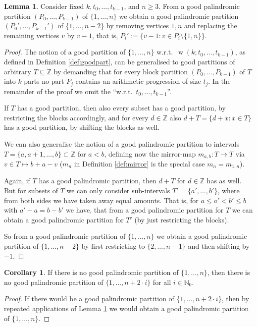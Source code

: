 \documentclass[final,3p,times]{elsarticle}
\theoremstyle{definition}
\newtheorem{lem}{Lemma}[section]
\newtheorem{cor}{Corollary}[lem]
\newcommand{\set}[1]{\{#1\}}
\renewcommand{\leq}{\le} %
\newcommand{\NN}{\mathbb{N}}
\newcommand{\NNZ}{\NN_0}
\newcommand{\ZZ}{\mathbb{Z}}
\DeclareMathOperator{\vdw}{w}
\begin{document}
\begin{lem}\label{lem:transferpdpartitions}
  Consider fixed $k, t_0, \dots, t_{k-1}$, and $n \geq 3$. From a good palindromic partition $(P_0, \dots, P_{k-1})$ of $\set{1,\dots,n}$ we obtain a good palindromic partition $(P_0', \dots, P_{k-1}')$ of $\set{1,\dots,n-2}$ by removing vertices $1, n$ and replacing the remaining vertices $v$ by $v-1$, that is, $P_i' := \set{v - 1 : v \in P_i \setminus \set{1,n}}$.
\end{lem}
\begin{proof}
The notion of a good partition of $\set{1,\dots,n}$ w.r.t.\ $\vdw(k; t_0,\dots,t_{k-1})$, as defined in Definition \ref{def:goodpart}, can be generalised to good partitions of arbitrary $T \subseteq \ZZ$ by demanding that for every block partition $(P_0,\dots,P_{k-1})$ of $T$ into $k$ parts no part $P_j$ contains an arithmetic progression of size $t_j$. In the remainder of the proof we omit the ``w.r.t.\ $t_0,\dots,t_{k-1}$''.

If $T$ has a good partition, then also every subset has a good partition, by restricting the blocks accordingly, and for every $d \in \ZZ$ also $d + T = \set{d + x : x \in T}$ has a good partition, by shifting the blocks as well.

We can also generalise the notion of a good palindromic partition to intervals $T = \set{a, a+1, \dots, b} \subset \ZZ$ for $a < b$, defining now the mirror-map $m_{a,b}: T \rightarrow T$ via $v \in T \mapsto b + a - v$ ($m_n$ in Definition \ref{def:mirror} is the special case $m_n = m_{1,n}$).

Again, if $T$ has a good palindromic partition, then $d + T$ for $d \in \ZZ$ has as well. But for subsets of $T$ we can only consider sub-intervals $T' = \set{a',\dots,b'}$, where from both sides we have taken away equal amounts. That is, for $a \leq a' < b' \leq b$ with $a' - a = b - b'$ we have, that from a good palindromic partition for $T$ we can obtain a good palindromic partition for $T'$ (by just restricting the blocks).

So from a good palindromic partition of $\set{1,\dots,n}$ we obtain a good palindromic partition of $\set{1,\dots,n-2}$ by first restricting to $\set{2,\dots,n-1}$ and then shifting by $-1$.
\end{proof}

\begin{cor}\label{cor:transferpdpartitions1}
  If  there is no good palindromic partition of $\set{1,\dots,n}$, then there is no good palindromic partition of $\set{1,\dots,n+2 \cdot i}$ for all $i \in \NNZ$.
\end{cor}
\begin{proof}
If there would be a good palindromic partition of $\set{1,\dots,n+2 \cdot i}$, then by repeated applications of Lemma \ref{lem:transferpdpartitions} we would obtain a good palindromic partition of $\set{1,\dots,n}$.
\end{proof}
\end{document}
